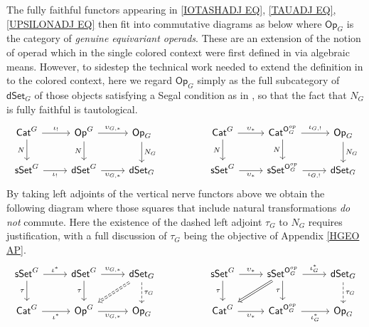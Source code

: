 \documentclass[a4paper,10pt]{article}%
\numberwithin{equation}{section}
\numberwithin{figure}{section}
\theoremstyle{definition} %
\newcommand{\1}{\ensuremath{\mathbbm 1}}%
\begin{document}
The fully faithful functors appearing in 
\eqref{IOTASHADJ EQ},
\eqref{TAUADJ EQ},
\eqref{UPSILONADJ EQ}
then fit into commutative diagrams
as below where $\mathsf{Op}_G$
is the category of \emph{genuine equivariant operads}.
These are an extension of the notion of operad
which in the single colored context were 
first defined in \cite{BP_geo}
via algebraic means. 
However, to sidestep the technical work needed to extend 
the definition in \cite{BP_geo} 
to the colored context,
here we regard $\mathsf{Op}_G$
simply as the full subcategory of 
$\mathsf{dSet}_G$
of those objects satisfying a Segal condition as in \cite[Defn. 3.35]{BP_edss},
so that the fact that
$N_G$ is fully faithful is tautological.
\begin{equation}\label{ALLFULL EQ}
\begin{tikzcd}
	\mathsf{Cat}^G
	\ar{r}{\iota_!}
	\ar{d}[swap]{N}
	&
	\mathsf{Op}^G
	\ar{r}{\upsilon_{G,\**}}
	\ar{d}[swap]{N}
	&
	\mathsf{Op}_G
	\ar{d}{N_G}
&&
	\mathsf{Cat}^G
	\ar{r}{\upsilon_{\**}}
	\ar{d}[swap]{N}
	&
	\mathsf{Cat}^{\mathsf{O}_G^{op}}
	\ar{r}{\iota_{G,!}}
	\ar{d}[swap]{N}
	&
	\mathsf{Op}_G
	\ar{d}{N_G}
\\
	\mathsf{sSet}^G
	\ar{r}[swap]{\iota_!}
	&
	\mathsf{dSet}^G
	\ar{r}[swap]{\upsilon_{G,\**}}
	&
	\mathsf{dSet}_G
	&&
	\mathsf{sSet}^G
	\ar{r}[swap]{\upsilon_{\**}}
	&
	\mathsf{sSet}^{\mathsf{O}_G^{op}}
	\ar{r}[swap]{\iota_{G,!}}
	&
\mathsf{dSet}_G
\end{tikzcd}
\end{equation}
By taking left adjoints of 
the vertical nerve functors above 
we obtain the following diagram
where those squares that include natural transformations
\emph{do not} commute. 
Here the existence of the dashed left adjoint 
$\tau_G$ to $N_G$
requires justification, 
with a full discussion of $\tau_G$
being the objective of Appendix \ref{HGEO AP}.
\begin{equation}\label{TAUFUNCTS EQ}
\begin{tikzcd}
	\mathsf{sSet}^G
	\ar{r}{\iota^{\**}}
	\ar{d}[swap]{\tau}
	&
	\mathsf{dSet}^G
	\ar{r}{\upsilon_{G,\**}}
	\ar{d}[swap]{\tau}
	&
	\mathsf{dSet}_G
	\ar[dashed]{d}{\tau_G}
	\ar[Rightarrow,dashed]{dl}
&&
	\mathsf{sSet}^G
	\ar{r}{\upsilon_{\**}}
	\ar{d}[swap]{\tau}
	&
	\mathsf{sSet}^{\mathsf{O}_G^{op}}
	\ar{r}{\iota^{\**}_G}
	\ar{d}[swap]{\tau}
	\ar[Rightarrow]{dl}
	&
	\mathsf{dSet}_G
	\ar[dashed]{d}{\tau_G}
\\
	\mathsf{Cat}^G
	\ar{r}[swap]{\iota^{\**}}
	&
	\mathsf{Op}^G
	\ar{r}[swap]{\upsilon_{G,\**}}
	&
	\mathsf{Op}_G
&&
	\mathsf{Cat}^G
	\ar{r}[swap]{\upsilon_{\**}}
	&
	\mathsf{Cat}^{\mathsf{O}_G^{op}}
	\ar{r}[swap]{\iota_{G}^{\**}}
	&
	\mathsf{Op}_G
\end{tikzcd}
\end{equation}
\end{document}
